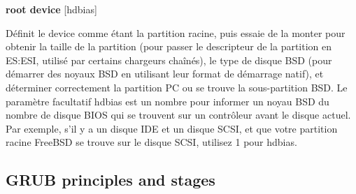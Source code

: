 \documentclass[10]{article}
\begin{document}
\textbf{root device} [hdbias] 	

D\'efinit le device comme \'etant la partition racine, puis essaie de la monter pour obtenir la taille de la partition (pour passer le descripteur de la partition en ES:ESI, utilis\'e par certains chargeurs chaîn\'es), le type de disque BSD (pour d\'emarrer des noyaux BSD en utilisant leur format de d\'emarrage natif), et d\'eterminer correctement la partition PC ou se trouve la sous-partition BSD. Le param\`etre facultatif hdbias est un nombre pour informer un noyau BSD du nombre de disque BIOS qui se trouvent sur un contrôleur avant le disque actuel. Par exemple, s'il y a un disque IDE et un disque SCSI, et que votre partition racine FreeBSD se trouve sur le disque SCSI, utilisez 1 pour hdbias. 

\subsection{GRUB principles and stages}
\end{document}
